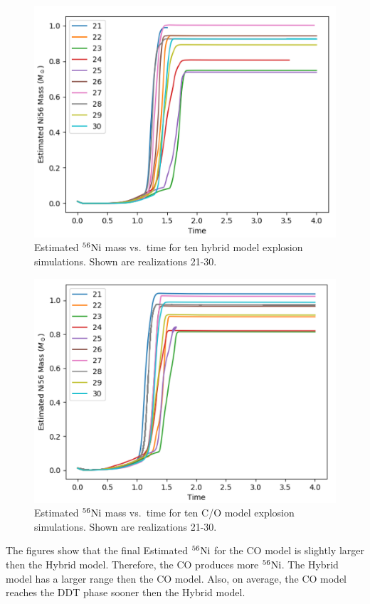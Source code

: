 \documentclass[iop,apj]{emulateapj}
\newcommand{\Ni}[1]{\ensuremath{{}^{#1}{\rm Ni}}}
\begin{document}
\begin{figure}
\includegraphics[width=\columnwidth]{figures/ni56_vs_time_hybrid.png}
\caption{\label{fig:nithybrid}
Estimated \Ni{56} mass vs.\ time for ten hybrid model explosion simulations. 
Shown are realizations 21-30. 
}
\end{figure}

\begin{figure}
\includegraphics[width=\columnwidth]{figures/ni56_vs_time_CO.png}
\caption{\label{fig:nitco}
Estimated \Ni{56} mass vs.\ time for ten C/O model explosion simulations.
Shown are realizations 21-30. 
}
\end{figure}

The figures show that the final Estimated \Ni{56} for the CO model is
slightly larger then the Hybrid model. Therefore, the CO produces more
\Ni{56}. The Hybrid model has a larger range then the CO model. Also, on
average, the CO model reaches the DDT phase sooner then the Hybrid model.
\end{document}
